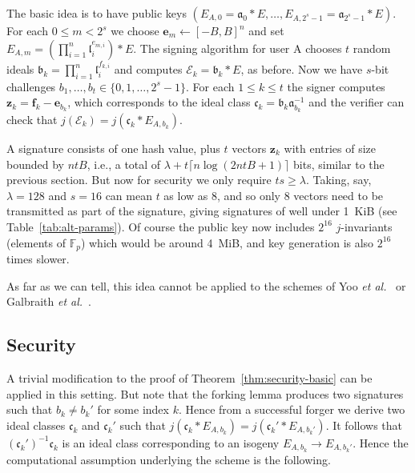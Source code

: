 \documentclass{llncs}
\newcommand{\E}{\mathcal{E}}
\newcommand{\F}{\mathbb{F}}
\renewcommand{\a}{\mathfrak{a}}
\renewcommand{\b}{\mathfrak{b}}
\renewcommand{\c}{\mathfrak{c}}
\renewcommand{\l}{\mathfrak{l}}
\newcommand{\e}{\mathbf{e}}
\newcommand{\f}{\mathbf{f}}
\newcommand{\z}{\mathbf{z}}
\begin{document}
The basic idea is to have public keys $( E_{A,0} = \a_0 * E , \dots , E_{A,2^s-1} = \a_{2^s-1} * E )$.
For each $0 \le m < 2^s$ we choose $\e_m \leftarrow [-B,B]^n$ and set $E_{A,m} = ( \prod_{i=1}^n \l_i^{e_{m,i}} ) * E$.
The signing algorithm for user A chooses $t$ random ideals $\b_k = \prod_{i=1}^n \l_i^{f_{k,i}}$ and computes $\E_k = \b_k * E$, as before.
Now we have $s$-bit challenges $b_1, \dots, b_t \in \{0, 1, \dots, 2^s-1 \}$.
For each $1 \le k \le t$ the signer computes $\z_k = \f_k - \e_{b_k}$, which corresponds to the ideal class $\c_k = \b_k \a_{b_k}^{-1} $ and the verifier can check that $j( \E_k ) = j( \c_k * E_{A, b_k})$.

A signature consists of one hash value, plus $t$ vectors $\z_k$ with entries of size bounded by $ntB$, i.e., a total of $\lambda + t\lceil n\log(2ntB + 1)\rceil$ bits, similar to the previous section.
But now for security we only require $ts \ge \lambda$.
Taking, say, $\lambda = 128$ and $s = 16$ can mean $t$ as low as 8, and so only 8 vectors need to be transmitted as part of the signature, giving signatures of well under 1~KiB (see Table~\ref{tab:alt-params}).
Of course the public key now includes $2^{16}$ $j$-invariants (elements of $\F_p$) which would be around 4~MiB, and key generation is also $2^{16}$ times slower.


As far as we can tell, this idea cannot be applied to the schemes of Yoo \emph{et al.}~\cite{YAJJS17} or Galbraith \emph{et al.}~\cite{GPS17}.





\subsection{Security}

A trivial modification to the proof of Theorem~\ref{thm:security-basic} can be applied in this setting. But note that the forking lemma produces two signatures such that $b_k \ne b_k'$ for some index $k$.
Hence from a successful forger we derive two ideal classes $\c_k$ and $\c_k'$ such that $j( \c_k * E_{A, b_k} ) = j( \c_k' * E_{A, b_k'})$. It follows that $(\c_k')^{-1} \c_k$ is an ideal class corresponding to an isogeny $E_{A,b_k} \to E_{A,b_k'}$.
Hence the computational assumption underlying the scheme is the following.
\end{document}
